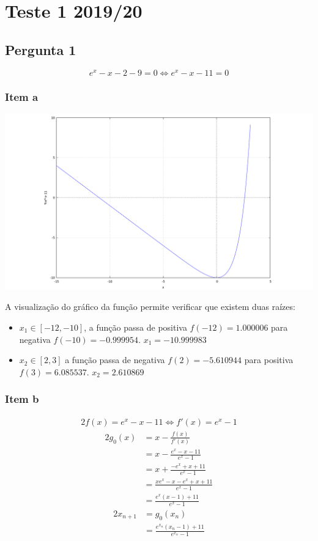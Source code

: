 \setcounter{chapter}{18}
\chapter{Teste 1 2019/20}
\section{Pergunta 1}
{
\renewcommand{\thesubsection}{\thesection\alph{subsection}}
\begin{equation*}
	e^x-x-2-9=0 \iff e^x-x-11=0
\end{equation*}
\subsection{Item a}

\begin{center} \includegraphics[scale=0.32]{2019T1_1a} \end{center}
A visualização do gráfico da função permite verificar que existem duas raízes:
\begin{itemize}
	\item $x_1 \in [-12,-10]$, a função passa de positiva $f(-12)=1.000006$ para negativa $f(-10)=-0.999954$. $x_1 = -10.999983$
	\item $x_2 \in [2,3]$ a função passa de negativa $f(2)=- 5.610944$ para positiva $f(3)=6.085537$. $x_2=2.610869$
\end{itemize}

\subsection{Item b}
\begin{alignat*}{2}
f(x)=e^x-x-11 \iff f'(x)=e^x-1
\end{alignat*}
\begin{alignat*}{2}
g_0(x)
&=x-\frac{f(x)}{f'(x)} \\
&=x-\frac{e^x-x-11}{e^x-1}\\
&=x+\frac{-e^x+x+11}{e^x-1}\\
&=\frac{xe^x-x-e^x+x+11}{e^x-1}\\
&=\frac{e^x(x-1)+11}{e^x-1}
\end{alignat*}
\begin{alignat*}{2}
x_{n+1}
&=g_0(x_n) \\
&=\frac{e^{x_n}(x_n-1)+11}{e^{x_n}-1}
\end{alignat*}
}
